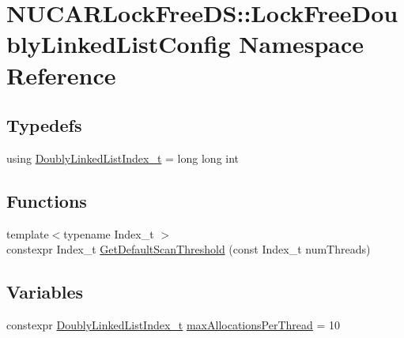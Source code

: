 \hypertarget{namespace_n_u_c_a_r_lock_free_d_s_1_1_lock_free_doubly_linked_list_config}{}\section{N\+U\+C\+A\+R\+Lock\+Free\+DS\+:\+:Lock\+Free\+Doubly\+Linked\+List\+Config Namespace Reference}
\label{namespace_n_u_c_a_r_lock_free_d_s_1_1_lock_free_doubly_linked_list_config}
\subsection*{Typedefs}
\begin{DoxyCompactItemize}
\item 
using \mbox{\hyperlink{namespace_n_u_c_a_r_lock_free_d_s_1_1_lock_free_doubly_linked_list_config_ad084f1e0e5259e450dbbbd2f7cfdb979}{Doubly\+Linked\+List\+Index\+\_\+t}} = long long int
\end{DoxyCompactItemize}
\subsection*{Functions}
\begin{DoxyCompactItemize}
\item 
{\footnotesize template$<$typename Index\+\_\+t $>$ }\\constexpr Index\+\_\+t \mbox{\hyperlink{namespace_n_u_c_a_r_lock_free_d_s_1_1_lock_free_doubly_linked_list_config_a43ef8849ef8b7bf92df8a6b5b8e22066}{Get\+Default\+Scan\+Threshold}} (const Index\+\_\+t num\+Threads)
\end{DoxyCompactItemize}
\subsection*{Variables}
\begin{DoxyCompactItemize}
\item 
constexpr \mbox{\hyperlink{namespace_n_u_c_a_r_lock_free_d_s_1_1_lock_free_doubly_linked_list_config_ad084f1e0e5259e450dbbbd2f7cfdb979}{Doubly\+Linked\+List\+Index\+\_\+t}} \mbox{\hyperlink{namespace_n_u_c_a_r_lock_free_d_s_1_1_lock_free_doubly_linked_list_config_a0dfa8a093d372cc44eb9a2eba65c5ab6}{max\+Allocations\+Per\+Thread}} = 10
\end{DoxyCompactItemize}


